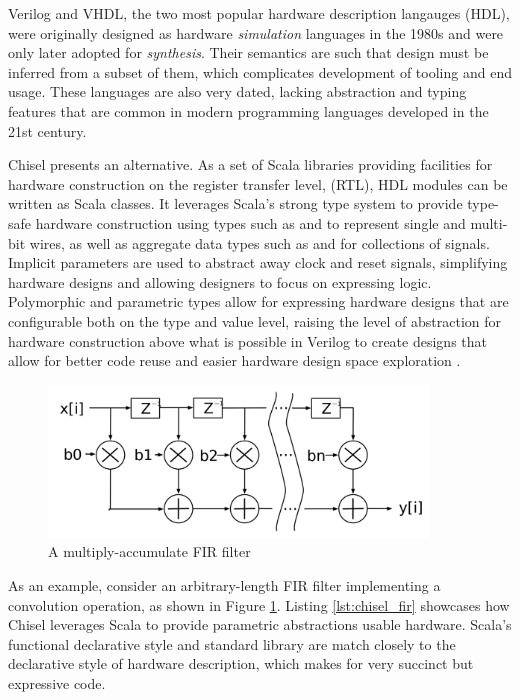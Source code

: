 Verilog and VHDL, the two most popular hardware description langauges (HDL), were originally designed as hardware \textit{simulation} languages in the 1980s and were only later adopted for \textit{synthesis}. Their semantics are such that design must be inferred from a subset of them, which complicates development of tooling and end usage. These languages are also very dated, lacking abstraction and typing features that are common in modern programming languages developed in the 21st century.

Chisel presents an alternative. As a set of Scala libraries providing facilities for hardware construction on the register transfer level, (RTL),  HDL modules can be written as Scala classes. It leverages Scala's strong type system to provide type-safe hardware construction using types such as  and  to represent single and multi-bit wires, as well as aggregate data types such as  and  for collections of signals. Implicit parameters are used to abstract away clock and reset signals, simplifying hardware designs and allowing designers to focus on expressing logic. Polymorphic and parametric types allow for expressing hardware designs that are configurable both on the type and value level, raising the level of abstraction for hardware construction above what is possible in Verilog to create designs that allow for better code reuse and easier hardware design space exploration \cite{chisel}.

\begin{figure}[H]
    \centering
    \includegraphics[width=0.9\textwidth]{../img/fir_filter.png}
    \caption{A multiply-accumulate FIR filter \cite{chisel_site}}
    \label{fig:fir}
\end{figure}

As an example, consider an arbitrary-length FIR filter implementing a convolution operation, as shown in Figure \ref{fig:fir}. Listing \ref{lst:chisel_fir} showcases how Chisel leverages Scala to provide parametric abstractions usable hardware. Scala's functional declarative style and standard library are match closely to the declarative style of hardware description, which makes for very succinct but expressive code.



